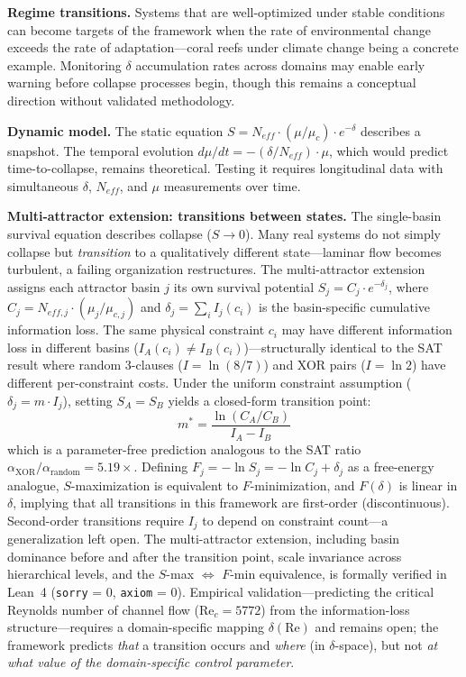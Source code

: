 \documentclass[11pt,a4paper]{article}
\begin{document}
\textbf{Regime transitions.} Systems that are well-optimized under stable conditions can become targets of the framework when the rate of environmental change exceeds the rate of adaptation---coral reefs under climate change being a concrete example. Monitoring $\delta$ accumulation rates across domains may enable early warning before collapse processes begin, though this remains a conceptual direction without validated methodology.

\textbf{Dynamic model.} The static equation $S = N_{eff} \cdot (\mu/\mu_c) \cdot e^{-\delta}$ describes a snapshot. The temporal evolution $d\mu/dt = -(\delta/N_{eff}) \cdot \mu$, which would predict time-to-collapse, remains theoretical. Testing it requires longitudinal data with simultaneous $\delta$, $N_{eff}$, and $\mu$ measurements over time.

\textbf{Multi-attractor extension: transitions between states.} The single-basin survival equation describes collapse ($S \to 0$). Many real systems do not simply collapse but \emph{transition} to a qualitatively different state---laminar flow becomes turbulent, a failing organization restructures. The multi-attractor extension assigns each attractor basin $j$ its own survival potential $S_j = C_j \cdot e^{-\delta_j}$, where $C_j = N_{eff,j} \cdot (\mu_j/\mu_{c,j})$ and $\delta_j = \sum_i I_j(c_i)$ is the basin-specific cumulative information loss. The same physical constraint $c_i$ may have different information loss in different basins ($I_A(c_i) \neq I_B(c_i)$)---structurally identical to the SAT result where random 3-clauses ($I = \ln(8/7)$) and XOR pairs ($I = \ln 2$) have different per-constraint costs. Under the uniform constraint assumption ($\delta_j = m \cdot I_j$), setting $S_A = S_B$ yields a closed-form transition point:
\[
m^* = \frac{\ln(C_A / C_B)}{I_A - I_B}
\]
which is a parameter-free prediction analogous to the SAT ratio $\alpha_{\text{XOR}}/\alpha_{\text{random}} = 5.19\times$. Defining $F_j = -\ln S_j = -\ln C_j + \delta_j$ as a free-energy analogue, $S$-maximization is equivalent to $F$-minimization, and $F(\delta)$ is linear in $\delta$, implying that all transitions in this framework are first-order (discontinuous). Second-order transitions require $I_j$ to depend on constraint count---a generalization left open. The multi-attractor extension, including basin dominance before and after the transition point, scale invariance across hierarchical levels, and the $S$-max $\Leftrightarrow$ $F$-min equivalence, is formally verified in Lean~4 (\texttt{sorry} = 0, \texttt{axiom} = 0). Empirical validation---predicting the critical Reynolds number of channel flow ($\text{Re}_c = 5772$) from the information-loss structure---requires a domain-specific mapping $\delta(\text{Re})$ and remains open; the framework predicts \emph{that} a transition occurs and \emph{where} (in $\delta$-space), but not \emph{at what value of the domain-specific control parameter}.
\end{document}
